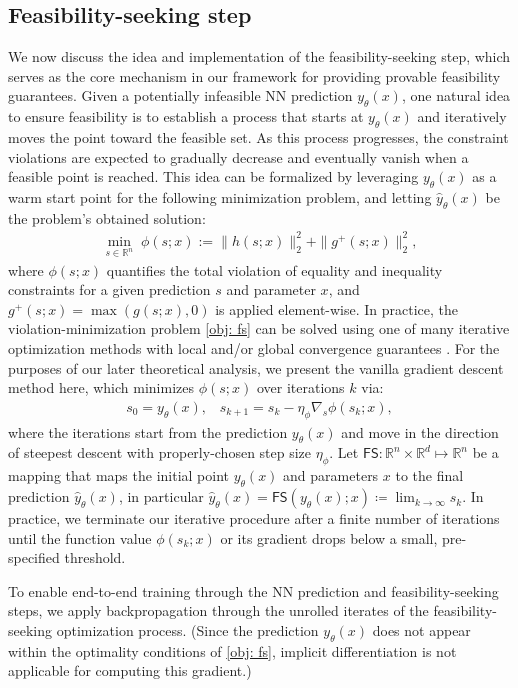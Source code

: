 \documentclass{article}
\def\R{\mathbb{R}}
\def\FS{\mathsf{FS}}
\def\x{x}
\def\y{y_{\theta}}   \def\hy{\hat{y}_{\theta}}    \def\ty{\Tilde{y}}
\begin{document}
\subsection{Feasibility-seeking step}\label{sec: fs}
We now discuss the idea and implementation of the feasibility-seeking step, which serves as the core mechanism in our framework for providing provable feasibility guarantees.
Given a potentially infeasible NN prediction $\y(\x)$, one natural idea to ensure feasibility is to establish a process that 
starts at $\y(\x)$ and iteratively moves the point toward the feasible set.
As this process progresses, the constraint violations are expected to gradually decrease and eventually vanish when a feasible point is reached.
This idea can be formalized by leveraging $\y(\x)$ as a warm start point for the following minimization problem, and letting $\hy(\x)$ be the problem's obtained solution:
\begin{align}\label{obj: fs}
   \min_{s \in \R^n} \; \phi (s;\x) := \|h(s; \x)\|_2^2 + \| g^+(s;\x) \|_2^2,
\end{align}
where $\phi(s;\x)$ quantifies the total violation of equality and inequality constraints for a given prediction $s$ and parameter $\x$, and $g^+(s;\x) = \max(g (s;\x), 0)$ is applied element-wise.
In practice, the violation-minimization problem \eqref{obj: fs} can be solved using one of many  iterative optimization methods with local and/or global convergence guarantees \cite{nocedal1999numerical}.
For the purposes of our later theoretical analysis,
we present the vanilla gradient descent method here, 
which minimizes $\phi(s;\x)$ over iterations $k$ via:
\begin{align}\label{eq: FS_GD}
        s_0 = \y(\x),  \;\;\; %
        s_{k+1} = s_k - \eta_\phi \nabla_s \phi(s_k; \x),
\end{align}
where the iterations start from the prediction $\y(\x)$ and move in the direction of steepest descent with properly-chosen step size $\eta_\phi$.
Let $\FS: \R^n \times \R^d \mapsto \R^n$ be a mapping that maps the initial point $\y(\x)$ and parameters $x$ to the final prediction $\hy(\x)$, in particular $\hy(\x) = \FS(\y(\x); \x) \coloneqq \lim_{k \rightarrow \infty} s_k$.
In practice, we terminate our iterative procedure after a finite number of iterations until the function value $\phi(s_k;\x)$ or its gradient drops below a small, pre-specified threshold. %

To enable end-to-end training through the NN prediction and feasibility-seeking steps, we apply backpropagation through the unrolled iterates of the feasibility-seeking optimization process. 
(Since the prediction $\y(\x)$ does not appear within the optimality conditions of \eqref{obj: fs}, implicit differentiation is not applicable for computing this gradient.)
\end{document}
